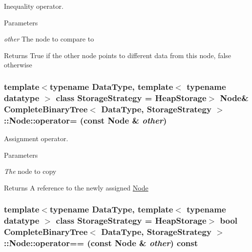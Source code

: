 Inequality operator. 


\begin{DoxyParams}{Parameters}
\item[{\em other}]The node to compare to \end{DoxyParams}
\begin{DoxyReturn}{Returns}
True if the other node points to different data from this node, false otherwise 
\end{DoxyReturn}
\hypertarget{class_complete_binary_tree_1_1_node_ac616ae7ce94b4647585cae0e1cc659b4}{
\subsubsection[{operator=}]{\setlength{\rightskip}{0pt plus 5cm}template$<$typename DataType, template$<$ typename datatype $>$ class StorageStrategy = HeapStorage$>$ {\bf Node}\& {\bf CompleteBinaryTree}$<$ DataType, StorageStrategy $>$::Node::operator= (const {\bf Node} \& {\em other})}}
\label{class_complete_binary_tree_1_1_node_ac616ae7ce94b4647585cae0e1cc659b4}


Assignment operator. 


\begin{DoxyParams}{Parameters}
\item[{\em The}]node to copy \end{DoxyParams}
\begin{DoxyReturn}{Returns}
A reference to the newly assigned \hyperlink{class_complete_binary_tree_1_1_node}{Node} 
\end{DoxyReturn}
\hypertarget{class_complete_binary_tree_1_1_node_a32bf1648f0071decd3e84b24c17dfbb3}{
\subsubsection[{operator==}]{\setlength{\rightskip}{0pt plus 5cm}template$<$typename DataType, template$<$ typename datatype $>$ class StorageStrategy = HeapStorage$>$ bool {\bf CompleteBinaryTree}$<$ DataType, StorageStrategy $>$::Node::operator== (const {\bf Node} \& {\em other}) const}}
\label{class_complete_binary_tree_1_1_node_a32bf1648f0071decd3e84b24c17dfbb3}


